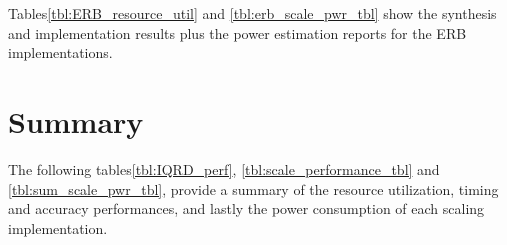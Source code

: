Tables\;\ref{tbl:ERB_resource_util} and \ref{tbl:erb_scale_pwr_tbl}
show the synthesis and implementation results 
plus the power estimation reports for the ERB implementations. 



\section{Summary}

The following tables\;\ref{tbl:IQRD_perf}, 
\;\ref{tbl:scale_performance_tbl} and \;\ref{tbl:sum_scale_pwr_tbl},
provide a summary of the
resource utilization, timing and accuracy performances, and lastly 
the power consumption of each scaling implementation.

